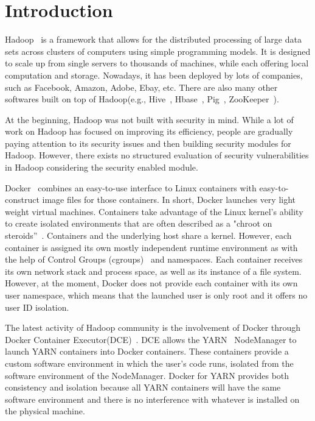\section{Introduction}

Hadoop~\cite{shvachko2010hadoop} is a framework that allows for the distributed processing of large data sets across clusters of computers using simple programming models. It is designed to scale up from single servers to thousands of machines, while each offering local computation and storage. Nowadays, it has been deployed by lots of companies, such as Facebook, Amazon, Adobe, Ebay, etc. There are also many other softwares built on top of Hadoop(e.g., Hive~\cite{thusoo2009hive,hive}, Hbase~\cite{hbase}, Pig~\cite{pig}, ZooKeeper~\cite{zookeeper}).

At the beginning, Hadoop was not built with security in mind. While a lot of work on Hadoop has focused on improving its efficiency, people are gradually paying attention to its security issues and then building security modules for Hadoop. However, there exists no structured evaluation of security vulnerabilities in Hadoop considering the security enabled module.




Docker~\cite{docker} combines an easy-to-use interface to Linux containers with easy-to-construct image files for those containers. In short, Docker launches very light weight virtual machines. Containers take advantage of the Linux kernel’s ability to create isolated environments that are often described as a "chroot on steroids”~\cite{schmidt2006high}. Containers and the underlying host share a kernel. However, each container is assigned its own mostly independent runtime environment as with the help of Control Groups (cgroups)~\cite{cgroups} and namespaces. Each container receives its own network stack and process space, as well as its instance of a file system. However, at the moment, Docker does not provide each container with its own user namespace, which means that the launched user is only root and it offers no user ID isolation.

The latest activity of Hadoop community is the involvement of Docker through Docker Container Executor(DCE)~\cite{dce}. DCE allows the YARN~\cite{yarn} NodeManager to launch YARN containers into Docker containers. These containers provide a custom software environment in which the user's code runs, isolated from the software environment of the NodeManager. Docker for YARN provides both consistency and isolation because all YARN containers will have the same software environment and there is no interference with whatever is installed on the physical machine.

